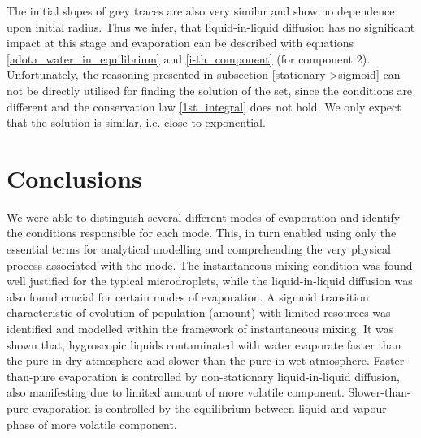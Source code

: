 \documentclass[twoside,twocolumn,9pt]{article}
\begin{document}
The initial slopes of grey traces are also very similar and show no dependence upon initial radius. Thus we infer, that liquid-in-liquid diffusion has no significant impact at this stage and evaporation can be described with equations \ref{adota_water_in_equilibrium} and \ref{i-th_component} (for component 2). Unfortunately, the reasoning presented in subsection \ref{stationary->sigmoid} can not be directly utilised for finding the solution of the set, since the conditions are different and the conservation law \ref{1st_integral} does not hold. We only expect that the solution is similar, i.e. close to exponential.


\section{Conclusions}
We were able to distinguish several different modes of evaporation and identify the conditions responsible for each mode. This, in turn enabled using only the essential terms for analytical modelling and comprehending the very physical process associated with the mode. The instantaneous mixing condition was found well justified for the typical microdroplets, while the liquid-in-liquid diffusion was also found crucial for certain modes of evaporation. A sigmoid transition characteristic of evolution of population (amount) with limited resources was identified and modelled within the framework of instantaneous mixing. It was shown that, hygroscopic liquids contaminated with water evaporate faster than the pure in dry atmosphere and slower than the pure in wet atmosphere. Faster-than-pure evaporation is controlled by non-stationary liquid-in-liquid diffusion, also manifesting due to limited amount of more volatile component. Slower-than-pure evaporation is controlled by the equilibrium between liquid and vapour phase of more volatile component.





\balance



\end{document}
